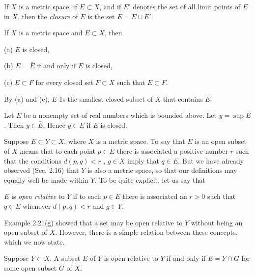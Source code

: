 \begin{myDef}
    \label{myDef:2.26 closure}
    If $X$ is a metric space, if $E \subset X$, and if $E'$ denotes the set of all limit points of $E$ in $X$, then the \emph{closure} of $E$ is the set $\bar{E}=E \cup E'$.
\end{myDef}

\begin{thm}
    \label{thm:2.27}
    If $X$ is a metric space and $E \subset X$, then
    
    (a) $E$ is closed,
    
    (b) $E = \bar{E}$ if and only if $E$ is closed,
    
    (c) $E \subset F$ for every closed set $F \subset X$ such that $E \subset F$.
\end{thm}
By (a) and (c), $E$ 1s the smallest closed subset of $X$ that contains $E$.

\begin{thm}
    \label{thm:2.28}
    Let $E$ be a nonempty set of real numbers which is bounded above.     Let $y = \sup E$. Then $y \in \bar{E}$. Hence $y \in E$ if $E$ is closed.
\end{thm}

\begin{myRemark}
    Suppose $E \subset Y \subset X$, where $X$ is a metric space. To say that $E$ is an open subset of $X$ means that to each point $p \in E$ there is associated a positive number $r$ such that the conditions $d(p,q) < r$ , $g \in X$ imply that $q \in E$. But we have already observed (Sec. 2.16) that $Y$ is also a metric space, so that our definitions may equally well be made within $Y$. To be quite explicit, let us say that 
    
    $E$ is \emph{open relative} to $Y$ if to each $p \in E$ there is associated an $r > 0$ such that $q \in E$ whenever $d(p,q) <r$ and $g \in Y$. 
    
    Example 2.21(g) showed that a set may be open relative to $Y$ without being an open subset of $X$. However, there is a simple relation between these concepts, which we now state.
\end{myRemark}

\begin{thm}
    \label{thm:2.30}
    Suppose $Y \subset X$. A subset $E$ of $Y$ is open relative to $Y$ if and only if $E = Y \cap G$ for some open subset $G$ of $X$.
\end{thm}